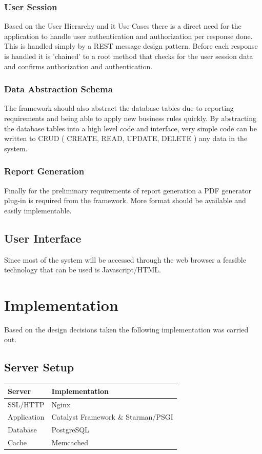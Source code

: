 \documentclass{journal}
\begin{document}
\subsubsection{User Session}

Based on the User Hierarchy and it Use Cases there is a direct need for the application to handle user authentication and authorization per response done. This is handled simply by a REST message design pattern. Before each response is handled it is 'chained' to a root method that checks for the user session data and confirms authorization and authentication.  

\subsubsection{Data Abstraction Schema}

The framework should also abstract the database tables due to reporting requirements and being able to apply new business rules quickly. By abstracting the database tables into a high level code and interface, very simple code can be written to CRUD ( CREATE, READ, UPDATE, DELETE ) any data in the system. 

\subsubsection{Report Generation}
Finally for the preliminary requirements of report generation a PDF generator plug-in is required from the framework. More format should be available and easily implementable. 

\subsection{User Interface}
Since most of the system will be accessed through the web browser a feasible technology that can be used is Javascript/HTML.  

\section{Implementation}
Based on the design decisions taken the following implementation was carried out. 

\subsection{Server Setup}

\begin{tabular}{| l | l |}
\hline
Server & Implementation \\
\hline
SSL/HTTP & Nginx \\
Application & Catalyst Framework \& Starman/PSGI \\
Database & PostgreSQL \\
Cache & Memcached \\
\hline 

\end{tabular}
\end{document}
